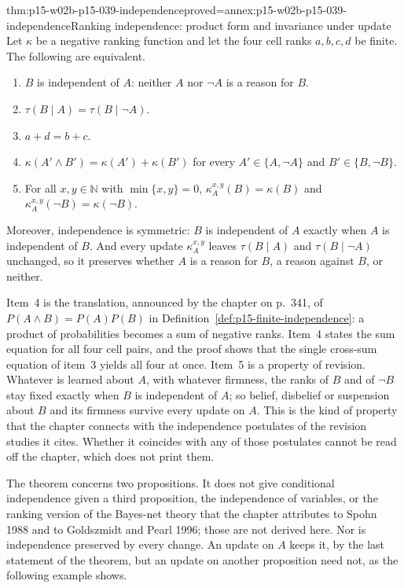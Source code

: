\begin{hbtheorem}{thm:p15-w02b-p15-039-independence}{proved=annex:p15-w02b-p15-039-independence}{Ranking independence: product form and invariance under update}
Let \(\kappa\) be a negative ranking function and let the four cell ranks
\(a,b,c,d\) be finite.  The following are equivalent.
\begin{enumerate}
\item \(B\) is independent of \(A\): neither \(A\) nor \(\neg A\) is a
 reason for \(B\).
\item \(\tau(B\mid A)=\tau(B\mid\neg A)\).
\item \(a+d=b+c\).
\item \(\kappa(A'\land B')=\kappa(A')+\kappa(B')\) for every
 \(A'\in\{A,\neg A\}\) and \(B'\in\{B,\neg B\}\).
\item For all \(x,y\in\mathbb N\) with \(\min\{x,y\}=0\),
 \(\kappa^{x,y}_A(B)=\kappa(B)\) and \(\kappa^{x,y}_A(\neg B)=\kappa(\neg B)\).
\end{enumerate}
Moreover, independence is symmetric: \(B\) is independent of \(A\) exactly
when \(A\) is independent of \(B\).  And every update \(\kappa^{x,y}_A\)
leaves \(\tau(B\mid A)\) and \(\tau(B\mid\neg A)\) unchanged, so it
preserves whether \(A\) is a reason for \(B\), a reason against \(B\), or
neither.
\end{hbtheorem}

Item~4 is the translation, announced by the chapter on p.~341, of
\(P(A\land B)=P(A)P(B)\) in Definition~\ref{def:p15-finite-independence}:
a product of probabilities becomes a sum of negative ranks.  Item~4 states
the sum equation for all four cell pairs, and the proof shows that the single
cross-sum equation of item~3 yields all four at once.  Item~5 is a property of
revision.  Whatever is learned about \(A\), with whatever firmness, the
ranks of \(B\) and of \(\neg B\) stay fixed exactly when \(B\) is
independent of \(A\); so belief, disbelief or suspension about \(B\) and
its firmness survive every update on \(A\).  This is the kind of property
that the chapter connects with the independence postulates of the revision
studies it cites.  Whether it coincides with any of those postulates cannot
be read off the chapter, which does not print them.

The theorem concerns two propositions.  It does not give conditional
independence given a third proposition, the independence of variables, or
the ranking version of the Bayes-net theory that the chapter attributes to
Spohn 1988 and to Goldszmidt and Pearl 1996; those are not derived here.
Nor is independence preserved by every change.  An update on \(A\) keeps it,
by the last statement of the theorem, but an update on another proposition
need not, as the following example shows.

